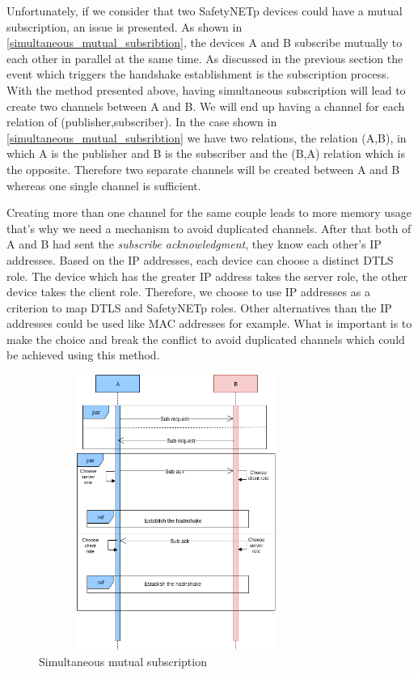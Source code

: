 Unfortunately, if we consider that two SafetyNETp devices could have a mutual subscription,
an issue is presented. As shown in \autoref{simultaneous_mutual_subsribtion}, the devices A and B subscribe mutually to each other in parallel
at the same time. As discussed in the previous section the event which triggers the
handshake establishment is the subscription process. With the method presented above, having simultaneous
subscription will lead to create two channels between A and B. We will end up having a channel for each relation of
(publisher,subscriber). In the case shown in \autoref{simultaneous_mutual_subsribtion} we have two relations, the relation (A,B), in which A
is the publisher and B is the subscriber and the (B,A) relation which is the opposite. Therefore two
separate channels will be created between A and B whereas one single channel is sufficient.

Creating more than one channel for the same couple leads to more memory usage that's why
we need a mechanism to avoid duplicated channels. After that both of A and B had sent
the \textit{subscribe acknowledgment}, they know each other's IP addresses. Based on the IP addresses,
each device can choose a distinct DTLS role. The device which has the greater IP address
takes the server role, the other device takes the client role.
Therefore, we choose to use IP addresses as a criterion to map DTLS and SafetyNETp roles. Other alternatives
than the IP addresses could be used like MAC addresses for example. What is important is to make the choice and break the conflict
to avoid duplicated channels which could be achieved using this method.

\begin{figure}[H]
\centering
\includegraphics[width=9cm,height=9cm]{figures/design/mutual_subsribtion.png}
\caption{Simultaneous mutual subscription}\label{simultaneous_mutual_subsribtion}
\end{figure}

